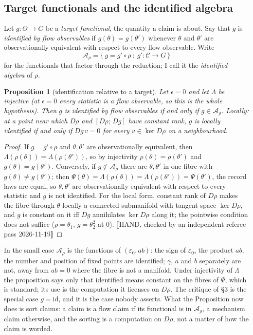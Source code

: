 \documentclass[10pt]{article}
\newtheorem{proposition}{Proposition}
\begin{document}
\subsection{Target functionals and the identified algebra}
Let $g:\Theta\to G$ be a \emph{target functional}, the quantity a claim is about. Say that $g$ is \emph{identified by flow observables} if $g(\theta)=g(\theta')$ whenever $\theta$ and $\theta'$ are observationally equivalent with respect to every flow observable. Write
\begin{equation}
\mathcal{A}_\rho=\{\,g=g'\circ\rho\ :\ g':\mathcal{C}\to G\,\}
\label{eq:algebra}
\end{equation}
for the functionals that factor through the reduction; I call it the \emph{identified algebra} of $\rho$.
\begin{proposition}[identification relative to a target]
Let $\epsilon=0$ and let $\Lambda$ be injective (at $\epsilon=0$ every statistic is a flow observable, so this is the whole hypothesis). Then $g$ is identified by flow observables if and only if $g\in\mathcal{A}_\rho$. Locally: at a point near which $D\rho$ and $[D\rho;\,Dg]$ have constant rank, $g$ is locally identified if and only if $Dg\,v=0$ for every $v\in\ker D\rho$ on a neighbourhood.
\end{proposition}
\begin{proof}
If $g=g'\circ\rho$ and $\theta,\theta'$ are observationally equivalent, then $\Lambda(\rho(\theta))=\Lambda(\rho(\theta'))$, so by injectivity $\rho(\theta)=\rho(\theta')$ and $g(\theta)=g(\theta')$. Conversely, if $g\notin\mathcal{A}_\rho$ there are $\theta,\theta'$ in one fibre with $g(\theta)\neq g(\theta')$; then $\Psi(\theta)=\Lambda(\rho(\theta))=\Lambda(\rho(\theta'))=\Psi(\theta')$, the record laws are equal, so $\theta,\theta'$ are observationally equivalent with respect to every statistic and $g$ is not identified. For the local form, constant rank of $D\rho$ makes the fibre through $\theta$ locally a connected submanifold with tangent space $\ker D\rho$, and $g$ is constant on it iff $Dg$ annihilates $\ker D\rho$ along it; the pointwise condition does not suffice ($\rho=\theta_1$, $g=\theta_2^2$ at $0$). \hfill⟦HAND, checked by an independent referee pass 2026-11-19⟧
\end{proof}
In the small case $\mathcal{A}_\rho$ is the functions of $(\varepsilon_0,ab)$: the sign of $\varepsilon_0$, the product $ab$, the number and position of fixed points are identified; $\gamma$, $a$ and $b$ separately are not, away from $ab=0$ where the fibre is not a manifold. Under injectivity of $\Lambda$ the proposition says only that identified means constant on the fibres of $\Psi$, which is standard; its use is the computation it licenses on $D\rho$. The critique of \S3 is the special case $g=\mathrm{id}$, and it is the case nobody asserts. What the Proposition now does is sort claims: a claim is a flow claim if its functional is in $\mathcal{A}_\rho$, a mechanism claim otherwise, and the sorting is a computation on $D\rho$, not a matter of how the claim is worded.
\end{document}
